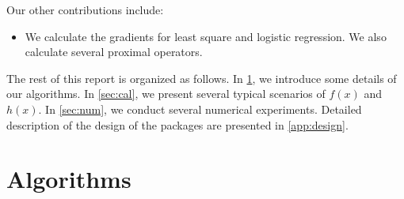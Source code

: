 \documentclass[a4paper]{article}
\begin{document}
  Our other contributions include:
  \begin{itemize}
    \item We calculate the gradients for least 
    square and logistic regression. We also calculate several 
    proximal operators.
  \end{itemize}

  The rest of this report is organized as follows. In \cref{sec:alg}, 
  we introduce some details of our algorithms. In \cref{sec:cal}, we 
  present several typical scenarios of $f(x)$ and $h(x)$. In 
  \cref{sec:num}, we conduct several numerical experiments. Detailed 
  description of the design of the packages are presented in 
  \cref{app:design}.
  
  
  
  \section{Algorithms}
  \label{sec:alg}
  
\end{document}
